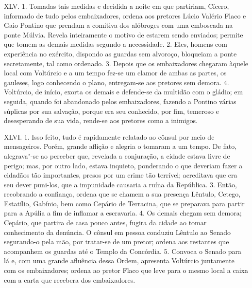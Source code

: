 XLV. 1. Tomadas tais medidas e decidida a noite em que partiriam, Cícero,
informado de tudo pelos embaixadores, ordena aos pretores Lúcio Valério Flaco e
Gaio Pontino que prendam a comitiva dos alóbroges com uma emboscada na ponte
Múlvia. Revela inteiramente o motivo de estarem sendo enviados; permite que
tomem as demais medidas segundo a necessidade. 2. Eles, homens com experiência
no exército, dispondo as guardas sem alvoroço, bloqueiam a ponte secretamente,
tal como ordenado. 3. Depois que os embaixadores chegaram àquele local com
Voltúrcio e a um tempo fez-se um clamor de ambas as partes, os gauleses, logo
conhecendo o plano, entregam-se aos pretores sem demora. 4. Voltúrcio, de
início, exorta os demais e defende-se da multidão com o gládio; em seguida,
quando foi abandonado pelos embaixadores, fazendo a Pontino várias súplicas por
sua salvação, porque era seu conhecido, por fim, temeroso e desesperando de sua
vida, rende-se aos pretores como a inimigos.

XLVI. 1. Isso feito, tudo é rapidamente relatado ao cônsul por meio de
mensageiros. Porém, grande aflição e alegria o tomaram a um tempo. De fato,
alegrava"-se ao perceber que, revelada a conjuração, a cidade estava livre de
perigo; mas, por outro lado, estava inquieto, ponderando o que deveriam fazer a
cidadãos tão importantes, presos por um crime tão terrível; acreditava que era
seu dever puni-los, que a impunidade causaria a ruína da República. 3. Então,
recobrando a confiança, ordena que se chamem a sua presença Lêntulo,
Cetego, Estatílio, Gabínio, bem como Cepário de Terracina, que se preparava
para partir para a Apúlia a fim de inflamar a escravaria. 4. Os demais chegam
sem demora; Cepário, que partira de casa pouco antes, fugira da cidade ao tomar
conhecimento da denúncia. O cônsul em pessoa conduziu Lêntulo ao Senado
segurando-o pela mão, por tratar-se de um pretor; ordena aos restantes que
acompanhem os guardas até o Templo da Concórdia. 5. Convoca o Senado para lá e,
com uma grande afluência dessa Ordem, apresenta Voltúrcio juntamente com os
embaixadores; ordena ao pretor Flaco que leve para o mesmo local a caixa com a
carta que recebera dos embaixadores.

